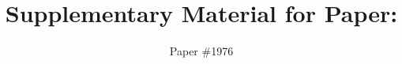 \documentclass[workingdraft]{paper}
\begin{document}
\title{Supplementary Material for Paper: \\ \sys}

\author{\small Paper \#1976}

\maketitle
\pagestyle{plain}



\nocite{*}

\end{document}
